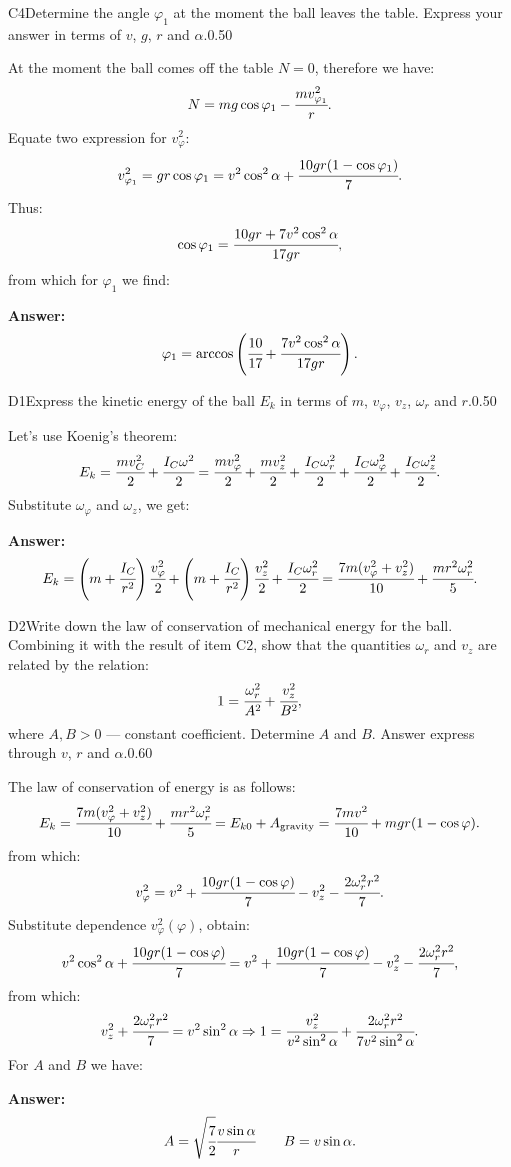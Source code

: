 \documentclass[11pt,a4paper]{article}
\begin{document}
\begin{solcard}{C4}{Determine the angle $\varphi_1$ at the moment the ball leaves the table. Express your answer in terms of $v$, $g$, $r$ and $\alpha$.}{0.50}

At the moment the ball comes off the table $N=0$, therefore we have: $$N=mg\cos\varphi_1-\cfrac{mv^2_{\varphi_1}}{r}{.} $$Equate two expression for $v^2_\varphi$: $$v^2_{\varphi_1}=gr\cos\varphi_1=v^2\cos^2\alpha+\cfrac{10gr(1-\cos\varphi_1)}{7}{.} $$Thus: $$\cos\varphi_1=\cfrac{10gr+7v^2\cos^2\alpha}{17gr}{,} $$from which for $\varphi_1$ we find:

\par\smallskip\noindent\textbf{Answer:} $$\varphi_1=\arccos\left(\cfrac{10}{17}+\cfrac{7v^2\cos^2\alpha}{17gr}\right){.} $$
\end{solcard}

\begin{solcard}{D1}{Express the kinetic energy of the ball $E_k$ in terms of $m$, $v_\varphi$, $v_z$, $\omega_r$ and $r$.}{0.50}

Let's use Koenig's theorem: $$E_k=\cfrac{mv^2_C}{2}+\cfrac{I_C\omega^2}{2}=\cfrac{mv^2_\varphi}{2}+\cfrac{mv^2_z}{2}+\cfrac{I_C\omega^2_r}{2}+\cfrac{I_C\omega^2_\varphi}{2}+\cfrac{I_C\omega^2_z}{2}{.} $$Substitute $\omega_\varphi$ and $\omega_z$, we get:

\par\smallskip\noindent\textbf{Answer:} $$E_k=\left(m+\cfrac{I_C}{r^2}\right)\cfrac{v^2_\varphi}{2}+\left(m+\cfrac{I_C}{r^2}\right)\cfrac{v^2_z}{2}+\cfrac{I_C\omega^2_r}{2}=\cfrac{7m(v^2_\varphi+v^2_z)}{10}+\cfrac{mr^2\omega^2_r}{5}{.} $$
\end{solcard}

\begin{solcard}{D2}{Write down the law of conservation of mechanical energy for the ball. Combining it with the result of item $\mathrm{C2}$, show that the quantities $\omega_r$ and $v_z$ are related by the relation: $$1=\cfrac{\omega^2_r}{A^2}+\cfrac{v^2_z}{B^2}{,} $$where $A,B>0$ — constant coefficient. Determine $A$ and $B$. Answer express through $v$, $r$ and $\alpha$.}{0.60}

The law of conservation of energy is as follows: $$E_k=\cfrac{7m(v^2_\varphi+v^2_z)}{10}+\cfrac{mr^2\omega^2_r}{5}=E_{k0}+A_\text{gravity}=\cfrac{7mv^2}{10}+mgr(1-\cos\varphi){.} $$from which: $$v^2_\varphi=v^2+\cfrac{10gr(1-\cos\varphi)}{7}-v^2_z-\cfrac{2\omega^2_rr^2}{7}{.} $$Substitute dependence $v^2_\varphi(\varphi)$, obtain: $$v^2\cos^2\alpha+\cfrac{10gr(1-\cos\varphi)}{7}=v^2+\cfrac{10gr(1-\cos\varphi)}{7}-v^2_z-\cfrac{2\omega^2_rr^2}{7}{,} $$from which: $$v^2_z+\cfrac{2\omega^2_rr^2}{7}=v^2\sin^2\alpha\Rightarrow 1=\cfrac{v^2_z}{v^2\sin^2\alpha}+\cfrac{2\omega^2_rr^2}{7v^2\sin^2\alpha}{.} $$For $A$ and $B$ we have:

\par\smallskip\noindent\textbf{Answer:} $$A=\sqrt{\cfrac{7}{2}}\cfrac{v\sin\alpha}{r}\qquad B=v\sin\alpha{.} $$
\end{solcard}
\end{document}
